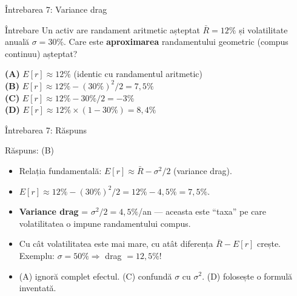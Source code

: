 \documentclass[9pt, aspectratio=169, t]{beamer}
\theoremstyle{definition}
\newenvironment{cminipage}[1]{%
    \par\noindent\hfill\begin{minipage}{#1}\ignorespaces
}{%
    \end{minipage}\hfill\null\par
}
\begin{document}
\begin{frame}{Întrebarea 7: Variance drag}
    \begin{cminipage}{0.95\textwidth}
    \begin{block}{Întrebare}
    Un activ are randament aritmetic așteptat $\bar{R} = 12\%$ și volatilitate anuală $\sigma = 30\%$.
    Care este \textbf{aproximarea} randamentului geometric (compus continuu) așteptat?
    \end{block}

    \vspace{0.2cm}
    \textcolor{MainBlue}{\textbf{(A)}} $E[r] \approx 12\%$ (identic cu randamentul aritmetic)\\[6pt]
    \textcolor{MainBlue}{\textbf{(B)}} $E[r] \approx 12\% - (30\%)^2/2 = 7{,}5\%$\\[6pt]
    \textcolor{MainBlue}{\textbf{(C)}} $E[r] \approx 12\% - 30\%/2 = -3\%$\\[6pt]
    \textcolor{MainBlue}{\textbf{(D)}} $E[r] \approx 12\% \times (1 - 30\%) = 8{,}4\%$
    \end{cminipage}
\end{frame}

\begin{frame}{Întrebarea 7: Răspuns}
    \begin{cminipage}{0.95\textwidth}
    \begin{exampleblock}{Răspuns: (B)}
    \begin{itemize}
        \item Relația fundamentală: $E[r] \approx \bar{R} - \sigma^2/2$ (variance drag).
        \item $E[r] \approx 12\% - (30\%)^2/2 = 12\% - 4{,}5\% = 7{,}5\%$.
        \item \textbf{Variance drag} = $\sigma^2/2 = 4{,}5\%$/an — aceasta este ``taxa'' pe care volatilitatea o impune randamentului compus.
        \item Cu cât volatilitatea este mai mare, cu atât diferența $\bar{R} - E[r]$ crește. Exemplu: $\sigma = 50\% \Rightarrow$ drag $= 12{,}5\%$!
        \item (A) ignoră complet efectul. (C) confundă $\sigma$ cu $\sigma^2$. (D) folosește o formulă inventată.
    \end{itemize}
    \end{exampleblock}
    \end{cminipage}
\end{frame}
\end{document}
